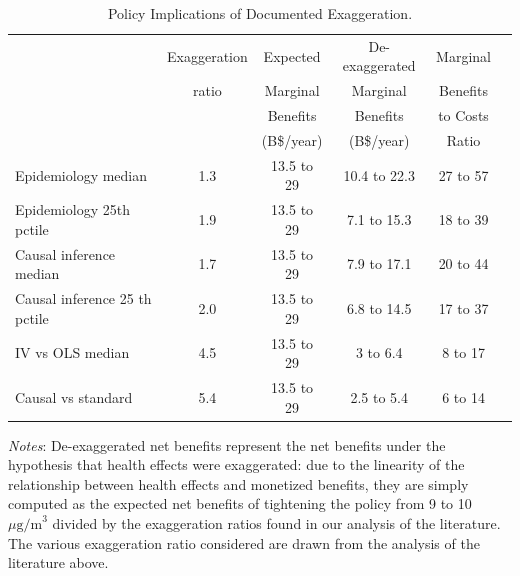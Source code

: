 \begin{table}[!ht]
	\caption{Policy Implications of Documented Exaggeration.}
	\label{tab:policy_implications}
	\centering
		\begin{threeparttable}
                		\begin{tabular}{lccccc}
                    		\toprule
                    			 & Exaggeration & Expected  & De-exaggerated  & Marginal\\ 
			 		 & ratio & Marginal & Marginal  & Benefits \\
			 		 &  & Benefits & Benefits & to Costs \\ 
			 		 &  &  (B\$/year) & (B\$/year) & Ratio \\ 
				\midrule
Epidemiology median & 1.3 & 13.5 to 29 & 10.4 to 22.3 & 27 to 57\\
Epidemiology 25th pctile & 1.9 & 13.5 to 29 & 7.1 to 15.3 & 18 to 39\\
Causal inference median & 1.7 & 13.5 to 29 & 7.9 to 17.1 & 20 to 44\\
Causal inference 25 th pctile & 2.0 & 13.5 to 29 & 6.8 to 14.5 & 17 to 37\\
IV vs OLS median & 4.5 & 13.5 to 29 & 3 to 6.4 & 8 to 17\\
Causal vs standard & 5.4 & 13.5 to 29 & 2.5 to 5.4 & 6 to 14\\
                    		\bottomrule
                \end{tabular}
                \begin{tablenotes}
                    \footnotesize
                    \item \textit{Notes}: De-exaggerated net benefits represent the net benefits under the hypothesis that health effects were exaggerated: due to the linearity of the relationship between health effects and monetized benefits, they are simply computed as the expected net benefits of tightening the policy from 9 to 10 $\mu\text{g/m}^3$ divided by the exaggeration ratios found in our analysis of the literature. The various exaggeration ratio considered are drawn from the analysis of the literature above.
                \end{tablenotes}
            \end{threeparttable}
\end{table}